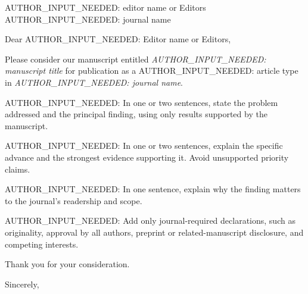 \documentclass[11pt]{letter}
\date{\today}
\begin{document}
\begin{letter}{AUTHOR\_INPUT\_NEEDED: editor name or Editors\\
AUTHOR\_INPUT\_NEEDED: journal name}

\opening{Dear AUTHOR\_INPUT\_NEEDED: Editor name or Editors,}

Please consider our manuscript entitled
\emph{AUTHOR\_INPUT\_NEEDED: manuscript title}
for publication as a
AUTHOR\_INPUT\_NEEDED: article type
in \emph{AUTHOR\_INPUT\_NEEDED: journal name}.

AUTHOR\_INPUT\_NEEDED: In one or two sentences, state the problem addressed and
the principal finding, using only results supported by the manuscript.

AUTHOR\_INPUT\_NEEDED: In one or two sentences, explain the specific advance and
the strongest evidence supporting it. Avoid unsupported priority claims.

AUTHOR\_INPUT\_NEEDED: In one sentence, explain why the finding matters to the
journal's readership and scope.

AUTHOR\_INPUT\_NEEDED: Add only journal-required declarations, such as
originality, approval by all authors, preprint or related-manuscript disclosure,
and competing interests.

Thank you for your consideration.

\closing{Sincerely,}

\end{letter}
\end{document}
